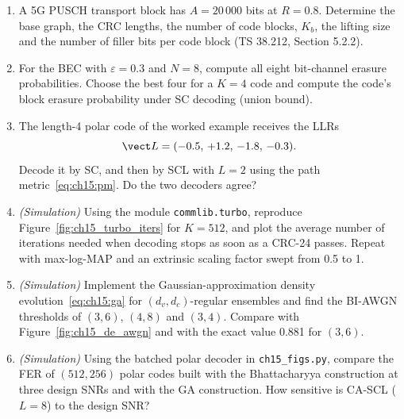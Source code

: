 \begin{enumerate}[label=\thechapter.\arabic*]
Figure~\ref{fig:ch15_lifting}.
\item A 5G PUSCH transport block has $A=20\,000$ bits at $R=0.8$. Determine the base graph, the CRC
lengths, the number of code blocks, $K_b$, the lifting size and the number of filler bits per code
block (TS 38.212, Section 5.2.2).
\item For the BEC with $\varepsilon=0.3$ and $N=8$, compute all eight bit-channel erasure
probabilities. Choose the best four for a $K=4$ code and compute the code's block erasure
probability under SC decoding (union bound).
\item The length-4 polar code of the worked example receives the LLRs
\[\vect L=(-0.5,\,+1.2,\,-1.8,\,-0.3).\]
Decode it by SC, and then by SCL with $L=2$ using the path
metric~\eqref{eq:ch15:pm}. Do the two decoders agree?
\item \emph{(Simulation)} Using the module \texttt{commlib.turbo}, reproduce Figure~\ref{fig:ch15_turbo_iters}
for $K=512$, and plot the average number of iterations needed when decoding stops as soon as a CRC-24
passes. Repeat with max-log-MAP and an extrinsic scaling factor swept from 0.5 to 1.
\item \emph{(Simulation)} Implement the Gaussian-approximation density evolution~\eqref{eq:ch15:ga}
for $(d_v,d_c)$-regular ensembles and find the BI-AWGN thresholds of $(3,6)$, $(4,8)$ and $(3,4)$.
Compare with Figure~\ref{fig:ch15_de_awgn} and with the exact value 0.881 for $(3,6)$.
\item \emph{(Simulation)} Using the batched polar decoder in \texttt{ch15\_figs.py}, compare the
FER of $(512,256)$ polar codes built with the Bhattacharyya construction at three design SNRs and with
the GA construction. How sensitive is CA-SCL ($L=8$) to the design SNR?
\end{enumerate}

